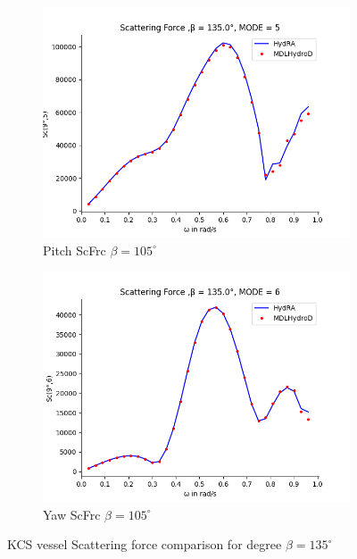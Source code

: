 \begin{figure}[H]
\begin{subfigure}[b]{0.45\textwidth}
        \includegraphics[width=\textwidth]{plots/kcs/sc/sc5.png}
        \caption{Pitch ScFrc $\beta = 105^{\circ}$}
    \end{subfigure}
    \begin{subfigure}[b]{0.45\textwidth}
        \includegraphics[width=\textwidth]{plots/kcs/sc/sc6.png}
        \caption{Yaw ScFrc $\beta = 105^{\circ}$}
    \end{subfigure}
    \caption{KCS vessel Scattering force comparison for degree $\beta= 135^{\circ}$}
    \label{fig:kcs_scattering_135}
\end{figure}

